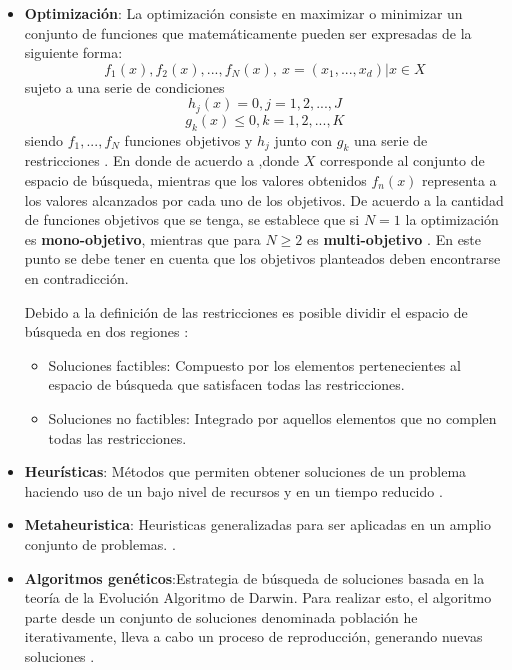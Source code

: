 \documentclass[11pt,letterpaper]{article}
\begin{document}
\begin{itemize}
\item \textbf{Optimización}: La optimización consiste en maximizar o minimizar un conjunto de funciones que matemáticamente pueden ser expresadas de la siguiente forma:
$$f_1(x),f_2(x), ..., f_N(x),\ x=(x_1,...,x_d) | x \in X$$
sujeto a una serie de condiciones
$$h_j(x) = 0, j=1,2,...,J$$
$$g_k(x) \leq 0, k=1,2,...,K$$
siendo $f_1,...,f_N$ funciones objetivos y   $h_j$ junto con $g_k$ una serie de restricciones \cite{Yang2015}. En donde de acuerdo a \cite{Lopez2013},donde $X$ corresponde al conjunto de espacio de búsqueda, mientras que los valores obtenidos $f_n(x)$ representa a los valores alcanzados por cada uno de los objetivos. De acuerdo a la cantidad de funciones objetivos que se tenga, se establece que si $N=1$ la optimización es \textbf{mono-objetivo}, mientras que para $N\geq 2$ es \textbf{multi-objetivo} \cite{Yang2015}. En este punto se debe tener en cuenta que los objetivos planteados deben encontrarse en contradicción. 

Debido a la definición de las restricciones es posible dividir el espacio de búsqueda en dos regiones \cite{Lopez2013}:
\begin{itemize}
	\item Soluciones factibles: Compuesto por los elementos pertenecientes al espacio de búsqueda que satisfacen todas las restricciones.
	\item Soluciones no factibles: Integrado por aquellos elementos que no complen todas las restricciones.
\end{itemize}


\item \textbf{Heurísticas}: Métodos que permiten obtener soluciones de un problema haciendo uso de un bajo nivel de recursos y en un tiempo reducido \cite{Lopez2013}.


\item \textbf{Metaheuristica}: Heuristicas generalizadas para ser aplicadas en un amplio conjunto de problemas. \cite{Lopez2013}.

\item \textbf{Algoritmos genéticos}:Estrategia de búsqueda de soluciones basada en la teoría de la Evolución Algoritmo de Darwin. Para realizar esto, el algoritmo parte desde un conjunto de soluciones denominada población he iterativamente, lleva a cabo un proceso de reproducción, generando nuevas soluciones \cite{Heiss-Czedik1997}.


\end{itemize}
\end{document}
